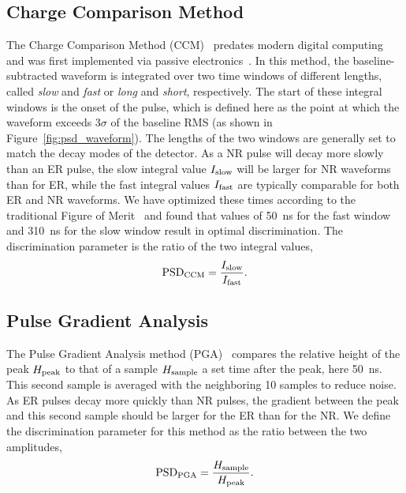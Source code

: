 \subsection{Charge Comparison Method}

The Charge Comparison Method (CCM)~\cite{Cester:2014,Kaschuck:2005,Liao:2014,WOLSKI:1995,Klein:2002,Ranucci:1998,Soderstrom:2008,Ranucci:1995} predates modern digital computing and was first implemented via passive electronics~\cite{Alexander:1961}. In this method, the baseline-subtracted waveform is integrated over two time windows of different lengths, called \textit{slow} and \textit{fast} or \textit{long} and \textit{short}, respectively. The start of these integral windows is the onset of the pulse, which is defined here as the point at which the waveform exceeds 3$\sigma$ of the baseline RMS (as shown in Figure~\ref{fig:psd_waveform}). The lengths of the two windows are generally set to match the decay modes of the detector. As a NR pulse will decay more slowly than an ER pulse, the slow integral value $I_{\mathrm{slow}}$ will be larger for NR waveforms than for ER, while the fast integral values $I_{\mathrm{fast}}$ are typically comparable for both ER and NR waveforms. We have optimized these times according to the traditional Figure of Merit~\cite{Annand:1987} and found that values of 50~ns for the fast window and 310~ns for the slow window result in optimal discrimination. The discrimination parameter is the ratio of the two integral values,
\begin{equation}
\mathrm{PSD}_{\mathrm{CCM}} = \frac{I_{\mathrm{slow}}}{I_{\mathrm{fast}}}.
\end{equation}

\subsection{Pulse Gradient Analysis}

The Pulse Gradient Analysis method (PGA)~\cite{DMellow:2007} compares the relative height of the peak $H_{\mathrm{peak}}$ to that of a sample $H_{\mathrm{sample}}$ a set time after the peak, here 50~ns. This second sample is averaged with the neighboring 10 samples to reduce noise. As ER pulses decay more quickly than NR pulses, the gradient between the peak and this second sample should be larger for the ER than for the NR. We define the discrimination parameter for this method as the ratio between the two amplitudes,
\begin{equation}
\mathrm{PSD}_{\mathrm{PGA}} = \frac{H_{\mathrm{sample}}}{H_{\mathrm{peak}}}.
\end{equation}

